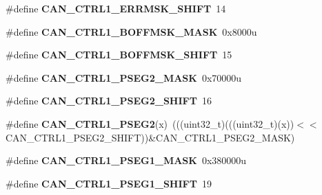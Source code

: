 \begin{DoxyCompactItemize}
\item 
\#define {\bfseries C\+A\+N\+\_\+\+C\+T\+R\+L1\+\_\+\+E\+R\+R\+M\+S\+K\+\_\+\+S\+H\+I\+FT}~14\hypertarget{group__CAN__Register__Masks_ga16b53de26664898f76f1cd545181782b}{}\label{group__CAN__Register__Masks_ga16b53de26664898f76f1cd545181782b}

\item 
\#define {\bfseries C\+A\+N\+\_\+\+C\+T\+R\+L1\+\_\+\+B\+O\+F\+F\+M\+S\+K\+\_\+\+M\+A\+SK}~0x8000u\hypertarget{group__CAN__Register__Masks_gafda1924bc397205b585b128187af9634}{}\label{group__CAN__Register__Masks_gafda1924bc397205b585b128187af9634}

\item 
\#define {\bfseries C\+A\+N\+\_\+\+C\+T\+R\+L1\+\_\+\+B\+O\+F\+F\+M\+S\+K\+\_\+\+S\+H\+I\+FT}~15\hypertarget{group__CAN__Register__Masks_ga9f3df553dda57c9cb36c599ee20bc598}{}\label{group__CAN__Register__Masks_ga9f3df553dda57c9cb36c599ee20bc598}

\item 
\#define {\bfseries C\+A\+N\+\_\+\+C\+T\+R\+L1\+\_\+\+P\+S\+E\+G2\+\_\+\+M\+A\+SK}~0x70000u\hypertarget{group__CAN__Register__Masks_ga204a1f6435e791f02d599543020b4b15}{}\label{group__CAN__Register__Masks_ga204a1f6435e791f02d599543020b4b15}

\item 
\#define {\bfseries C\+A\+N\+\_\+\+C\+T\+R\+L1\+\_\+\+P\+S\+E\+G2\+\_\+\+S\+H\+I\+FT}~16\hypertarget{group__CAN__Register__Masks_ga667a8faa98245aa9fa5afc6e71b7f640}{}\label{group__CAN__Register__Masks_ga667a8faa98245aa9fa5afc6e71b7f640}

\item 
\#define {\bfseries C\+A\+N\+\_\+\+C\+T\+R\+L1\+\_\+\+P\+S\+E\+G2}(x)~(((uint32\+\_\+t)(((uint32\+\_\+t)(x))$<$$<$C\+A\+N\+\_\+\+C\+T\+R\+L1\+\_\+\+P\+S\+E\+G2\+\_\+\+S\+H\+I\+FT))\&C\+A\+N\+\_\+\+C\+T\+R\+L1\+\_\+\+P\+S\+E\+G2\+\_\+\+M\+A\+SK)\hypertarget{group__CAN__Register__Masks_ga946e3c21fc4af7782950571c86ae9f91}{}\label{group__CAN__Register__Masks_ga946e3c21fc4af7782950571c86ae9f91}

\item 
\#define {\bfseries C\+A\+N\+\_\+\+C\+T\+R\+L1\+\_\+\+P\+S\+E\+G1\+\_\+\+M\+A\+SK}~0x380000u\hypertarget{group__CAN__Register__Masks_gac32963f42638264064b58687c249c994}{}\label{group__CAN__Register__Masks_gac32963f42638264064b58687c249c994}

\item 
\#define {\bfseries C\+A\+N\+\_\+\+C\+T\+R\+L1\+\_\+\+P\+S\+E\+G1\+\_\+\+S\+H\+I\+FT}~19\hypertarget{group__CAN__Register__Masks_gab92532aaca53b7fae9c2d9d7186e3a91}{}\label{group__CAN__Register__Masks_gab92532aaca53b7fae9c2d9d7186e3a91}


\end{DoxyCompactItemize}
